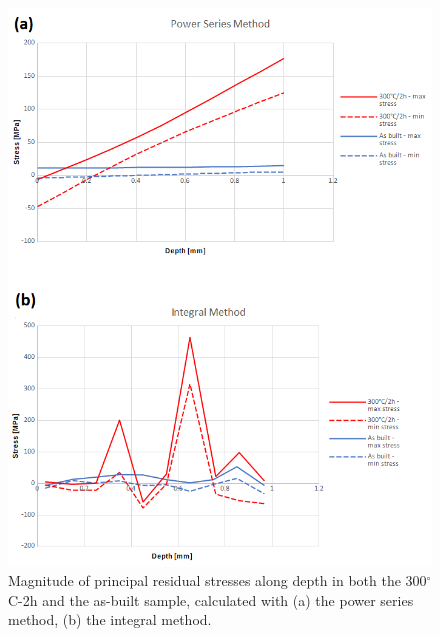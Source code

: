\begin{figure}[ht]
	\centering
	\centerline{\includegraphics[scale=0.60]{Images/result_rs1}}
	\decoRule
	\caption[Magnitude of principal residual stresses along depth in both the 300$^\circ$C-2h and the as-built sample, calculated with (a) the power series method, (b) the integral method]{Magnitude of principal residual stresses along depth in both the 300$^\circ$C-2h and the as-built sample, calculated with (a) the power series method, (b) the integral method.}
	\label{fig:result_rs1}
\end{figure}